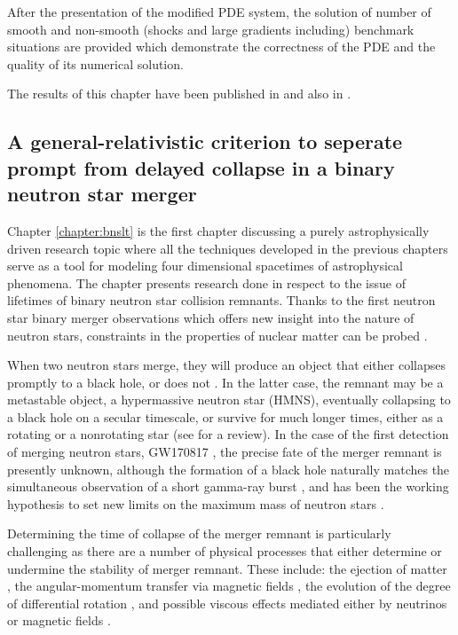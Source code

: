 \begin{fullwidth}
After the presentation of the modified PDE system, the solution of
number of smooth and non-smooth (\ie shocks and large gradients
including) benchmark situations are provided which demonstrate the
correctness of the PDE and the quality of its numerical solution.

The results of this chapter have been published in \cite{Fambri2018}
and also in \cite{Koeppel2018,exahype-review,exahype-guidebook}.

\subsection{A general-relativistic criterion to seperate prompt from delayed
	collapse in a binary neutron star merger}\label{sec:bnslt-intro}
Chapter \vref{chapter:bnslt}  is the first chapter discussing a purely
astrophysically driven research topic where all the techniques
developed in the previous chapters serve as a tool for modeling
four dimensional spacetimes of astrophysical phenomena. The chapter
presents research done in respect to the issue of lifetimes of binary
neutron star collision remnants. Thanks to the first neutron star
binary merger observations \cite{Abbott2017} which offers new insight
into the nature of neutron stars, constraints in the properties of
nuclear matter can be probed \cite{Annala2017, Paschalidis2017,
 Bauswein2017b,Radice2017b,Most2018, Burgio2018, Montana2018}.

When two neutron stars merge, they will produce an object that either
collapses promptly to a black hole, or does not \cite{Baiotti08}. In the
latter case, the remnant may be a metastable object, \eg a hypermassive
neutron star (HMNS), eventually collapsing to a black hole on a secular
timescale, or survive for much longer times, either as a rotating or a
nonrotating star (see \eg \cite{Baiotti2016} for a review). In the case
of the first detection of merging neutron stars, GW170817
\cite{Abbott2017}, the precise fate of the merger remnant is
presently unknown, although the formation of a black hole naturally
matches the simultaneous observation of a short gamma-ray burst
\cite{Eichler89, Rezzolla:2011}, and has been the working hypothesis to
set new limits on the maximum mass of neutron stars \cite{Margalit2017,
	Shibata2017c, Rezzolla2017, Ruiz2017}.

Determining the time of collapse of the merger remnant is particularly
challenging as there are a number of physical processes that either
determine or undermine the stability of merger remnant. These include:
the ejection of matter \cite{Rosswog1999, Kyutoku2012, Radice2016,
	Lehner2016, Dietrich2016, Bovard2017}, the angular-momentum transfer
via magnetic fields \cite{Kiuchi2015a, Siegel2013, Kawamura2016}, the
evolution of the degree of differential rotation \cite{Kastaun2016,
	Hanauske2016}, and possible viscous effects mediated either by
neutrinos or magnetic fields \cite{Duez2004b, Shibata:2017b, Radice2017,
	Alford2017}.


\end{fullwidth}
